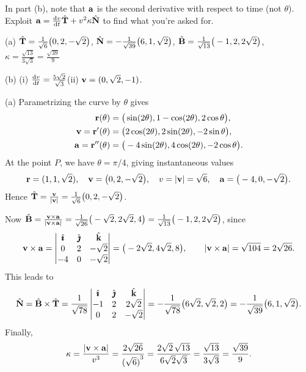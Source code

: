 \begin{hint} 
In part (b), note that $\mathbf{a}$ is the second derivative with respect
       to time (not $\theta$). Exploit $\va = \diff{v}{t}\hat\vT + v^2\kappa\hat\vN$ to  find what you're asked for.
\end{hint}

\begin{answer} 
(a) $\hat{\mathbf{T}} = \frac{1}{\sqrt6}\big(0,2,-\sqrt2\big)$,
    $\hat{\mathbf{N}} = -\frac{1}{\sqrt{39}}\big(6,1,\sqrt2\big)$,
    $\hat{\mathbf{B}} = \frac{1}{\sqrt{13}}\big(-1,2,2\sqrt2\big)$,
    $\kappa = \frac{\sqrt{13}}{3\sqrt3} = \frac{\sqrt{39}}{9}$

(b) (i) $\diff{v}{t}=\frac{5\sqrt2}{\sqrt3}$\qquad (ii) $\mathbf{v} = (0,\sqrt2,-1)$.
\end{answer}

\begin{solution} (a)
Parametrizing the curve by $\theta$ gives
\begin{align*}
\mathbf{r}(\theta) &= \big(\sin(2\theta),1-\cos(2\theta),2\cos\theta\big),
\\
\mathbf{v} =\mathbf{r}'(\theta)&= \big(2\cos(2\theta),2\sin(2\theta),-2\sin\theta\big),
\\
\mathbf{a} = \mathbf{r}''(\theta)&=\big(-4\sin(2\theta),4\cos(2\theta),-2\cos\theta\big).
\end{align*}
At the point $P$, we have $\theta=\pi/4$, giving instantaneous
values
$$
\mathbf{r} = (1,1,\sqrt2),
\quad
\mathbf{v} = \big(0,2,-\sqrt2\big),
\quad
v = |\mathbf{v}| = \sqrt6,
\quad
\mathbf{a} = \big(-4,0,-\sqrt2\big).
$$
Hence $\hat{\mathbf{T}} = \frac{\mathbf{v}}{|\mathbf{v}|} 
   = \frac{1}{\sqrt6}\big(0,2,-\sqrt2\big)$.


Now $\hat{\mathbf{B}} = \frac{\mathbf{v}\times\mathbf{a}}{|\mathbf{v}\times\mathbf{a}|}
= \frac{1}{\sqrt{26}}\big(-\sqrt2,2\sqrt2,4\big)
= \frac{1}{\sqrt{13}}\big(-1,2,2\sqrt2\big)$,
since
$$
\mathbf{v}\times\mathbf{a}
= \left|\begin{matrix}\hat{\pmb{\imath}} & \hat{\pmb{\jmath}} & \hat{\mathbf{k}} \\
0 & 2 & -\sqrt2 \\
-4 & 0 & -\sqrt2 \end{matrix}\right|
= \big(-2\sqrt2,4\sqrt2,8\big),
\qquad
|\mathbf{v}\times\mathbf{a}| = \sqrt{104} = 2\sqrt{26}.
$$
This leads to
$$
\hat{\mathbf{N}} = \hat{\mathbf{B}}\times\hat{\mathbf{T}}
=\frac{1}{\sqrt{78}} \left|\begin{matrix}\hat{\pmb{\imath}} & \hat{\pmb{\jmath}} & \hat{\mathbf{k}} \\
-1 & 2 & 2\sqrt2 \\
0  & 2 & -\sqrt2 \end{matrix}\right|
= -\frac{1}{\sqrt{78}}\big(6\sqrt2,\sqrt2,2\big)
= -\frac{1}{\sqrt{39}}\big(6,1,\sqrt2\big).
$$
Finally,
$$
\kappa = \frac{|\mathbf{v}\times\mathbf{a}|}{v^3}
= \frac{2\sqrt{26}}{{(\sqrt{6})}^3} 
= \frac{2\sqrt2\,\sqrt{13}}{6\sqrt2\sqrt3}
= \frac{\sqrt{13}}{3\sqrt3} = \frac{\sqrt{39}}{9}.
$$


\end{solution}

